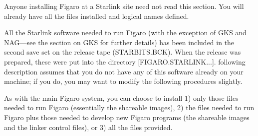 Anyone installing Figaro at a Starlink site need not read this section.  You
will already have all the files installed and logical names defined.

All the Starlink software needed to run Figaro (with the exception of GKS and
NAG---see the section on GKS for further details) has been included  in the
second save set on the release tape (STARBITS.BCK). When the  release was
prepared, these were put into the directory [FIGARO.STARLINK...].  following
description assumes that you do not have any of this software already on your
machine; if you do, you may want to modify the following procedures slightly.

As with the main Figaro system, you can choose to install 1) only those files 
needed to run Figaro (essentially the shareable images), 2) the files needed to
run Figaro plus those needed to develop new Figaro programs (the shareable
images and the linker control files), or 3) all the files provided.

